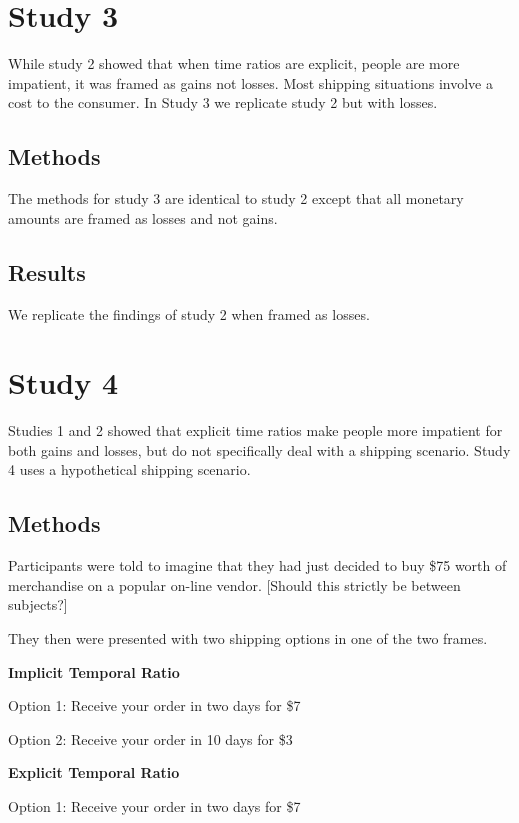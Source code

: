 \documentclass[]{article}
\begin{document}
\section{Study 3}

While study 2 showed that when time ratios are explicit, people are more impatient, it was framed as gains not losses.
Most shipping situations involve a cost to the consumer. 
In Study 3 we replicate study 2 but with losses.

\subsection{Methods}

The methods for study 3 are identical to study 2 except that all monetary amounts are framed as losses and not gains. 

\subsection{Results}

We replicate the findings of study 2 when framed as losses. 

\section{Study 4}

Studies 1 and 2 showed that explicit time ratios make people more impatient for both gains and losses, but do not specifically deal with a shipping scenario. Study 4 uses a hypothetical shipping scenario.

\subsection{Methods}

Participants were told to imagine that they had just decided to buy \$75 worth of merchandise on a popular on-line vendor. 
[Should this strictly be between subjects?]

They then were presented with two shipping options in one of the two frames.

\textbf{Implicit Temporal Ratio}

Option 1: Receive your order in two days for \$7

Option 2: Receive your order in 10 days for \$3
 
 
\textbf{Explicit Temporal Ratio}

Option 1: Receive your order in two days for \$7
\end{document}
